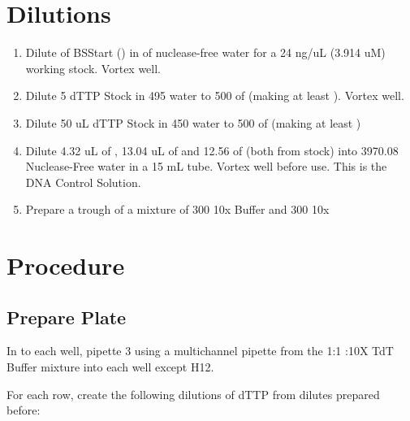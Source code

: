 \documentclass{ssiBio}
\begin{document}
\section{Dilutions}
\begin{enumerate}
    \item{Dilute  of BSStart () in  of nuclease-free water for a 24 ng/uL (3.914 uM) working stock. Vortex well.}
    \item{Dilute 5 \uL{}  dTTP Stock in 495 \uL{} water to 500\uL{} of  (making at least ). Vortex well.}
    \item{Dilute 50 uL  dTTP Stock in 450\uL{} water to 500\uL{} of  (making at least )}
    \item{Dilute 4.32 uL of , 13.04 uL of  and 12.56 of  (both from  stock) into 3970.08 \uL{} Nuclease-Free water in a 15 mL tube. Vortex well before use. This is the DNA Control Solution.}
    \item{Prepare a trough of a mixture of 300\uL{} 10x Buffer and 300\uL{} 10x }
\end{enumerate}

\section{Procedure}%
\subsection{Prepare Plate}
In to each well, pipette 3\uL{} using a multichannel pipette from the 1:1 :10X TdT Buffer mixture into each well except H12. 

For each row, create the following dilutions of dTTP from dilutes prepared before:
\end{document}
